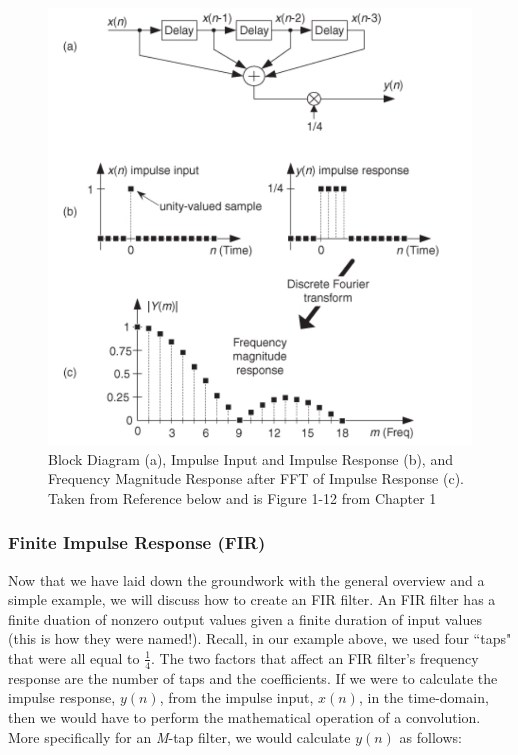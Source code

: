 \begin{figure}[h!]
	\centering
	\includegraphics[scale = .6]{images/impulse.png} %
	\caption{Block Diagram (a), Impulse Input and Impulse Response (b), and Frequency Magnitude Response after FFT of Impulse Response (c).  Taken from Reference \cite{lyons:intro} below and is Figure 1-12 from Chapter 1}
	\label{fig:impulse}
\end{figure}   

\subsubsection{Finite Impulse Response (FIR)}

Now that we have laid down the groundwork with the general
overview and a simple example, we will discuss how to create an
FIR filter. An FIR filter has a finite duation of nonzero output
values given a finite duration of input values (this is how they
were named!). Recall, in our example above, we used four ``taps"
that were all equal to $\frac{1}{4}$. The two factors that affect
an FIR filter's frequency response are the number of taps and the
coefficients\cite{lyons:intro}. If we were to calculate the
impulse response, $y(n)$, from the impulse input, $x(n)$, in the
time-domain, then we would have to perform the mathematical
operation of a convolution. More specifically for an
\textit{M}-tap filter, we would calculate $y(n)$ as follows:

